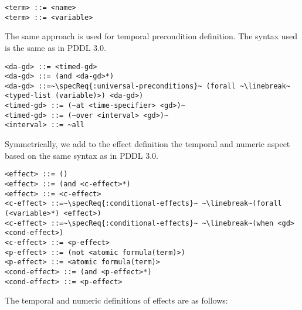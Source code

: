 \documentclass[letterpaper]{article} %
\begin{document}
\begin{lstlisting}[firstnumber=last, escapechar=~]
<term> ::= <name>
<term> ::= <variable>
\end{lstlisting}

%
%

\noindent The same approach is used for temporal precondition definition. The syntax used is the same as in PDDL 3.0.

\begin{lstlisting}[firstnumber=last, escapechar=~]
<da-gd> ::= <timed-gd>
<da-gd> ::= (and <da-gd>*)
<da-gd> ::=~\specReq{:universal-preconditions}~ (forall ~\linebreak~ <typed-list (variable)>) <da-gd>)
<timed-gd> ::= (~at <time-specifier> <gd>)~
<timed-gd> ::= (~over <interval> <gd>)~
<interval> ::= ~all
\end{lstlisting}

%
%
\noindent Symmetrically, we add to the effect definition the temporal and numeric aspect based on the same syntax as in PDDL 3.0.

\begin{lstlisting}[firstnumber=last, escapechar=~]
<effect> ::= ()
<effect> ::= (and <c-effect>*)
<effect> ::= <c-effect>
<c-effect> ::=~\specReq{:conditional-effects}~ ~\linebreak~(forall (<variable>*) <effect>)
<c-effect> ::=~\specReq{:conditional-effects}~ ~\linebreak~(when <gd> <cond-effect>)
<c-effect> ::= <p-effect>
<p-effect> ::= (not <atomic formula(term)>)
<p-effect> ::= <atomic formula(term)>
<cond-effect> ::= (and <p-effect>*)
<cond-effect> ::= <p-effect>
\end{lstlisting}

%
%

\noindent The temporal and numeric definitions of effects are as follows:
\end{document}
